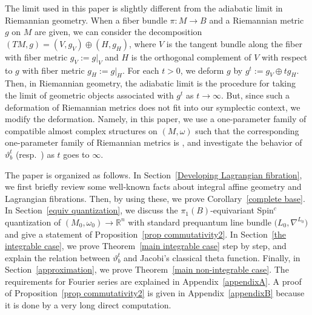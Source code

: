 \documentclass[pdftex]{sigma}
\numberwithin{equation}{section}
\newcommand{\R}{\mathbb{R}}
\renewcommand{\tilde}{\widetilde}
\begin{document}
The limit used in this paper is slightly different from the adiabatic limit in Riemannian geometry. When a fiber bundle $\pi\colon M\to B$ and a Riemannian metric $g$ on $M$ are given, we can consider the decomposition $(TM, g)=(V, g_V)\oplus (H, g_H)$, where $V$ is the tangent bundle along the fiber with fiber metric $g_V:=g|_V$ and $H$ is the orthogonal complement of $V$ with respect to $g$ with fiber metric $g_H:=g|_H$. For each $t>0$, we deform $g$ by
$g^t:=g_V\oplus tg_H$. Then, in Riemannian geometry, the adiabatic limit is the procedure for taking the limit of geometric objects associated with
$g^t$ as $t\to \infty$. But, since such a deformation of Riemannian metrics does not fit into our symplectic context, we modify the deformation. Namely, in this paper, we use a one-parameter family  of compatible almost complex structures on $(M,\omega)$ such that the corresponding one-parameter family of Riemannian metrics is , and investigate the behavior of $\vartheta^t_b$ \big(resp.\ \smash{${\tilde \vartheta}^t_b$}\big) as $t$ goes to $\infty$.

The paper is organized as follows. In Section~\ref{Developing Lagrangian fibration}, we first briefly review some well-known facts about integral affine geometry and Lagrangian fibrations. Then, by using these, we prove Corollary~\ref{complete base}. In Section~\ref{equiv quantization}, we discuss the $\pi_1(B)$-equivariant Spin${}^c$ quantization of ${(M_0, \omega_0)\to \R^n}$
with standard prequantum line bundle $\bigl( L_0, \nabla^{L_0}\bigr)$ and give a statement of Proposition~\ref{prop commutativity2}. In Section~\ref{the integrable case}, we prove Theorem~\ref{main integrable case} step by step, and explain the relation between $\vartheta^t_b$ and Jacobi's classical theta function. Finally, in Section~\ref{approximation}, we prove Theorem~\ref{main non-integrable case}. The requirements for Fourier series are explained in Appendix~\ref{appendixA}. A proof of Proposition~\ref{prop commutativity2} is given in Appendix~\ref{appendixB} because it is done by a very long direct computation.
\end{document}
